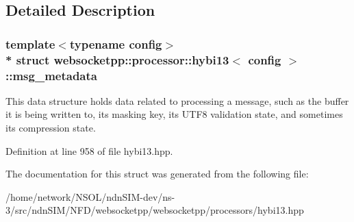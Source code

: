 \subsection{Detailed Description}
\subsubsection*{template$<$typename config$>$\\*
struct websocketpp\+::processor\+::hybi13$<$ config $>$\+::msg\+\_\+metadata}

This data structure holds data related to processing a message, such as the buffer it is being written to, its masking key, its U\+T\+F8 validation state, and sometimes its compression state. 

Definition at line 958 of file hybi13.\+hpp.



The documentation for this struct was generated from the following file\+:\begin{DoxyCompactItemize}
\item 
/home/network/\+N\+S\+O\+L/ndn\+S\+I\+M-\/dev/ns-\/3/src/ndn\+S\+I\+M/\+N\+F\+D/websocketpp/websocketpp/processors/hybi13.\+hpp\end{DoxyCompactItemize}
